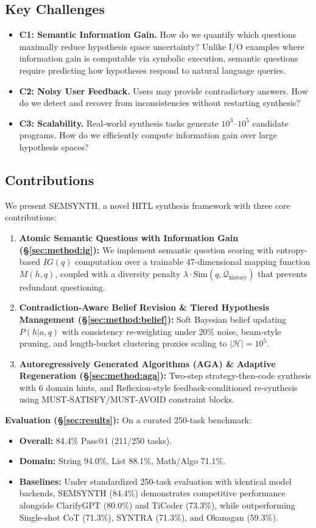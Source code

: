 \documentclass[10pt,conference]{IEEEtran}
\begin{document}
\subsection{Key Challenges}
\begin{itemize}
  \item \textbf{C1: Semantic Information Gain.} How do we quantify which questions maximally reduce hypothesis space uncertainty? Unlike I/O examples where information gain is computable via symbolic execution, semantic questions require predicting how hypotheses respond to natural language queries.
  \item \textbf{C2: Noisy User Feedback.} Users may provide contradictory answers. How do we detect and recover from inconsistencies without restarting synthesis?
  \item \textbf{C3: Scalability.} Real-world synthesis tasks generate $10^3$--$10^5$ candidate programs. How do we efficiently compute information gain over large hypothesis spaces?
\end{itemize}

\subsection{Contributions}
We present SEMSYNTH, a novel HITL synthesis framework with three core contributions:
\begin{enumerate}
  \item \textbf{Atomic Semantic Questions with Information Gain (\S\ref{sec:method:ig}):} We implement semantic question scoring with entropy-based $IG(q)$ computation over a trainable 47-dimensional mapping function $M(h, q)$, coupled with a diversity penalty $\lambda \cdot \text{Sim}(q, \mathcal{Q}_{\text{history}})$ that prevents redundant questioning.
  \item \textbf{Contradiction-Aware Belief Revision \& Tiered Hypothesis Management (\S\ref{sec:method:belief}):} Soft Bayesian belief updating $P(h|a,q)$ with consistency re-weighting under 20\% noise, beam-style pruning, and length-bucket clustering proxies scaling to $|\mathcal{H}| = 10^5$.
  \item \textbf{Autoregressively Generated Algorithms (AGA) \& Adaptive Regeneration (\S\ref{sec:method:aga}):} Two-step strategy-then-code synthesis with 6 domain hints, and Reflexion-style feedback-conditioned re-synthesis using MUST-SATISFY/MUST-AVOID constraint blocks.
\end{enumerate}

\textbf{Evaluation (\S\ref{sec:results}):} On a curated 250-task benchmark:
\begin{itemize}
  \item \textbf{Overall:} 84.4\% Pass@1 (211/250 tasks).
  \item \textbf{Domain:} String 94.0\%, List 88.1\%, Math/Algo 71.1\%.
  \item \textbf{Baselines:} Under standardized 250-task evaluation with identical model backends, SEMSYNTH (84.4\%) demonstrates competitive performance alongside ClarifyGPT (80.0\%) and TiCoder (73.3\%), while outperforming Single-shot CoT (71.3\%), SYNTRA (71.3\%), and Okanagan (59.3\%).
\end{itemize}
\end{document}
